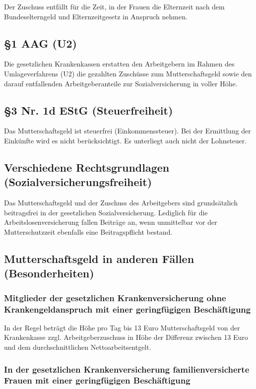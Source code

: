 \documentclass[a4paper, 12pt]{report}
\begin{document}
\begin{multicols}{2}
Der Zuschuss entfällt für die Zeit, in der Frauen die Elternzeit nach dem
Bundeselterngeld und Elternzeitgesetz in Anspruch nehmen.

\subsection{\S 1 AAG (U2)}

Die gesetzlichen Krankenkassen erstatten den Arbeitgebern im Rahmen des
Umlageverfahrens (U2) die gezahlten Zuschüsse zum Mutterschaftsgeld sowie den
darauf entfallenden Arbeitgeberanteile zur Sozialversicherung in voller Höhe.

\subsection{\S 3 Nr. 1d EStG (Steuerfreiheit)}

Das Mutterschaftsgeld ist steuerfrei (Einkommenssteuer). Bei der Ermittlung der
Einkünfte wird es nicht berücksichtigt. Es unterliegt auch nicht der Lohnsteuer.

\subsection{Verschiedene Rechtsgrundlagen (Sozialversicherungsfreiheit)}

Das Mutterschaftsgeld und der Zuschuss des Arbeitgebers sind grundsätzlich
beitragsfrei in der gesetzlichen  Sozialversicherung. Lediglich für die
Arbeitslosenversicherung fallen Beiträge an, wenn unmittelbar vor der
Mutterschutzzeit ebenfalls eine Beitragspflicht bestand.

\subsection{Mutterschaftsgeld in anderen Fällen (Besonderheiten)}

\subsubsection{Mitglieder der gesetzlichen Krankenversicherung ohne
Krankengeldanspruch mit  einer geringfügigen Beschäftigung}

In der Regel beträgt die Höhe pro Tag bis 13 Euro Mutterschaftsgeld von der
Krankenkasse zzgl. Arbeitgeberzuschuss in Höhe der Differenz zwischen 13 Euro
und dem durchschnittlichen Nettoarbeitsentgelt.

\subsubsection{In der gesetzlichen Krankenversicherung familienversicherte
Frauen mit einer geringfügigen Beschäftigung}


\end{multicols}
\end{document}
